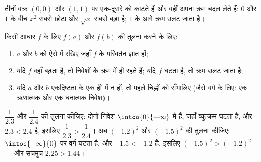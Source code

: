 \begin{omfigure}

{\small तीनों वक्र $(0,0)$ और $(1,1)$ पर एक-दूसरे को काटते हैं और वहीं अपना क्रम
बदल लेते हैं: $0$ और $1$ के बीच $x^2$ सबसे छोटा और $\sqrt x$ सबसे बड़ा है;
$1$ के आगे क्रम उलट जाता है।}
\end{omfigure}

\begin{method}[प्रतिबिंबों की तुलना]\label{met:g10:reffunc:compare}
किसी आधार  $f$ के लिए $f(a)$ और $f(b)$ की तुलना करने के लिए:
\begin{enumerate}
  \item $a$ और $b$ को ऐसे  में रखिए जहाँ $f$ के परिवर्तन ज्ञात
        हों;
  \item यदि $f$ वहाँ बढ़ता है, तो  निवेशों के क्रम में ही रहते
        हैं; यदि $f$ घटता है, तो क्रम उलट जाता है;
  \item यदि $a$ और $b$ एकदिष्टता के एक ही  में न हों, तो पहले
        चिह्नों को सँभालिए (जैसे वर्ग के लिए: एक ऋणात्मक और एक धनात्मक
        निवेश)।
\end{enumerate}
\end{method}

\begin{example}
$\dfrac{1}{2.3}$ और $\dfrac{1}{2.4}$ की तुलना कीजिए: दोनों निवेश $\intoo{0}{+\infty}$ में हैं, जहाँ व्युत्क्रम
 घटता है, और $2.3 < 2.4$ है, इसलिए $\dfrac{1}{2.3} > \dfrac{1}{2.4}$। अब $(-1.2)^2$ और $(-1.5)^2$ की तुलना कीजिए:
$\intoc{-\infty}{0}$ पर वर्ग घटता है, और $-1.5 < -1.2$ है, इसलिए $(-1.5)^2 > (-1.2)^2$ --- और सचमुच $2.25 > 1.44$।
\end{example}

